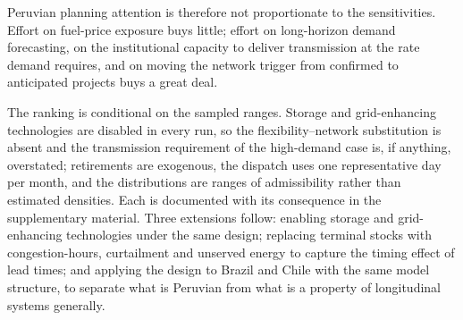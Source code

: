 Peruvian planning attention is therefore not proportionate to the sensitivities. Effort
on fuel-price exposure buys little; effort on long-horizon demand forecasting, on the
institutional capacity to deliver transmission at the rate demand requires, and on
moving the network trigger from confirmed to anticipated projects
\citep{sauma2006,herding2024} buys a great deal.

The ranking is conditional on the sampled ranges. Storage and grid-enhancing
technologies are disabled in every run, so the flexibility--network substitution is
absent and the transmission requirement of the high-demand case is, if anything,
overstated; retirements are exogenous, the dispatch uses one representative day per
month, and the distributions are ranges of admissibility rather than estimated
densities. Each is documented with its consequence in the supplementary material.
Three extensions follow: enabling storage and grid-enhancing technologies under the
same design; replacing terminal stocks with congestion-hours, curtailment and unserved
energy to capture the timing effect of lead times; and applying the design to Brazil
and Chile with the same model structure, to separate what is Peruvian from what is a
property of longitudinal systems generally.
